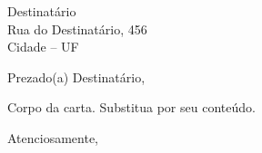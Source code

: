 \documentclass[12pt,a4paper]{letter}
\begin{document}
\begin{letter}{Destinatário \\ Rua do Destinatário, 456 \\ Cidade -- UF}

\opening{Prezado(a) Destinatário,}

Corpo da carta. Substitua por seu conteúdo.

\closing{Atenciosamente,}


\end{letter}
\end{document}
